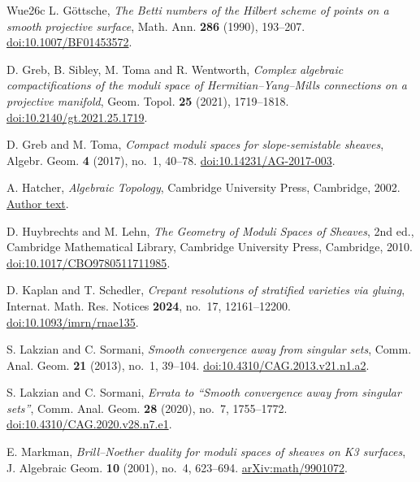 \begin{thebibliography}{Wue26c}
L. G\"ottsche,
\emph{The Betti numbers of the Hilbert scheme of points on a smooth
projective surface}, Math. Ann. \textbf{286} (1990), 193--207.
\href{https://doi.org/10.1007/BF01453572}{doi:10.1007/BF01453572}.

D. Greb, B. Sibley, M. Toma and R. Wentworth,
\emph{Complex algebraic compactifications of the moduli space of
Hermitian--Yang--Mills connections on a projective manifold},
Geom. Topol. \textbf{25} (2021), 1719--1818.
\href{https://doi.org/10.2140/gt.2021.25.1719}{doi:10.2140/gt.2021.25.1719}.

D. Greb and M. Toma,
\emph{Compact moduli spaces for slope-semistable sheaves},
Algebr. Geom. \textbf{4} (2017), no.~1, 40--78.
\href{https://doi.org/10.14231/AG-2017-003}{doi:10.14231/AG-2017-003}.

A. Hatcher,
\emph{Algebraic Topology}, Cambridge University Press,
Cambridge, 2002.
\href{https://pi.math.cornell.edu/~hatcher/AT/ATpage.html}{Author text}.

D. Huybrechts and M. Lehn,
\emph{The Geometry of Moduli Spaces of Sheaves}, 2nd ed.,
Cambridge Mathematical Library, Cambridge University Press,
Cambridge, 2010.
\href{https://doi.org/10.1017/CBO9780511711985}{doi:10.1017/CBO9780511711985}.

D. Kaplan and T. Schedler,
\emph{Crepant resolutions of stratified varieties via gluing},
Internat. Math. Res. Notices \textbf{2024}, no.~17, 12161--12200.
\href{https://doi.org/10.1093/imrn/rnae135}{doi:10.1093/imrn/rnae135}.

S. Lakzian and C. Sormani,
\emph{Smooth convergence away from singular sets},
Comm. Anal. Geom. \textbf{21} (2013), no.~1, 39--104.
\href{https://doi.org/10.4310/CAG.2013.v21.n1.a2}{doi:10.4310/CAG.2013.v21.n1.a2}.

S. Lakzian and C. Sormani,
\emph{Errata to “Smooth convergence away from singular sets”},
Comm. Anal. Geom. \textbf{28} (2020), no.~7, 1755--1772.
\href{https://doi.org/10.4310/CAG.2020.v28.n7.e1}{doi:10.4310/CAG.2020.v28.n7.e1}.

E. Markman,
\emph{Brill--Noether duality for moduli spaces of sheaves on K3 surfaces},
J. Algebraic Geom. \textbf{10} (2001), no.~4, 623--694.
\href{https://arxiv.org/abs/math/9901072}{arXiv:math/9901072}.


\end{thebibliography}
